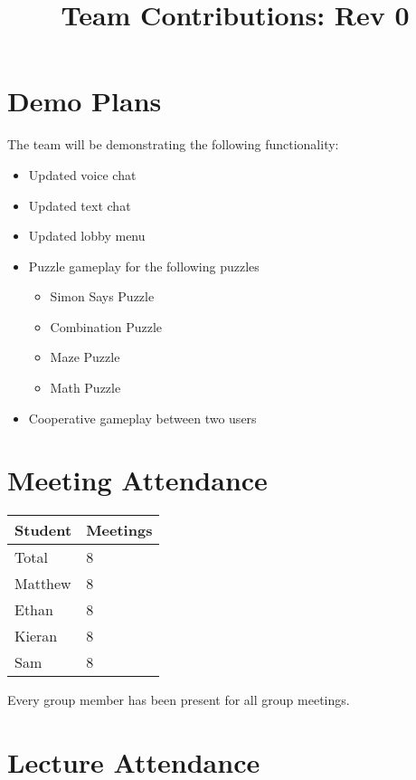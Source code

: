 \documentclass{article}
\title{Team Contributions: Rev 0\\\progname}
\author{\authname}
\date{}
\begin{document}
\maketitle

\section{Demo Plans}

The team will be demonstrating the following functionality:
\begin{itemize}
    \item Updated voice chat
    \item Updated text chat
    \item Updated lobby menu
    \item Puzzle gameplay for the following puzzles
        \begin{itemize}
            \item Simon Says Puzzle
            \item Combination Puzzle
            \item Maze Puzzle
            \item Math Puzzle
        \end{itemize}
    \item Cooperative gameplay between two users
\end{itemize}

\section{Meeting Attendance}

\begin{table}[H]
\centering
\begin{tabular}{ll}
\toprule
\textbf{Student} & \textbf{Meetings}\\
\midrule
Total & 8\\
Matthew & 8\\
Ethan & 8\\
Kieran & 8\\
Sam & 8\\
\bottomrule
\end{tabular}
\end{table}

Every group member has been present for all group meetings.

\section{Lecture Attendance}
\end{document}
